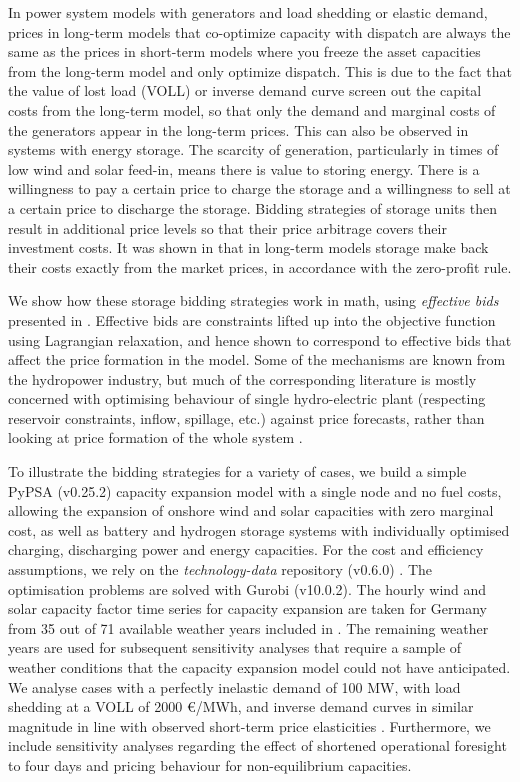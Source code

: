 \documentclass[final,3p]{elsarticle}
\begin{document}
In power system models with generators and load shedding or elastic demand,
prices in long-term models that co-optimize capacity with dispatch are always
the same as the prices in short-term models where you freeze the asset
capacities from the long-term model and only optimize dispatch. This is due to
the fact that the value of lost load (VOLL)  or inverse demand curve screen out
the capital costs from the long-term model, so that only the demand and marginal
costs of the generators appear in the long-term prices. This can also be
observed in systems with energy storage. The scarcity of generation,
particularly in times of low wind and solar feed-in, means there is value to
storing energy. There is a willingness to pay a certain price to charge the
storage and a willingness to sell at a certain price to discharge the storage.
Bidding strategies of storage units then result in additional price levels so
that their price arbitrage covers their investment costs. It was shown in
\cite{Brown2020} that in long-term models storage make back their costs exactly
from the market prices, in accordance with the zero-profit rule.

We show how these storage bidding strategies work in math, using
\textit{effective bids} presented in \cite{Brown2020}. Effective bids are
constraints lifted up into the objective function using Lagrangian relaxation,
and hence shown to correspond to effective bids that affect the price formation
in the model. Some of the mechanisms are known from the hydropower industry, but
much of the corresponding literature is mostly concerned with optimising
behaviour of single hydro-electric plant (respecting reservoir constraints,
inflow, spillage, etc.) against price forecasts, rather than looking at price
formation of the whole system
\cite{lederer1984overall,Pereira1989,Rotting1992,Fosso1999,CRAMPES2019100746}.

To illustrate the bidding strategies for a variety of cases, we build a simple
PyPSA (v0.25.2) \cite{PyPSA} capacity expansion model with a single node and no
fuel costs, allowing the expansion of onshore wind and solar capacities with
zero marginal cost, as well as battery and hydrogen storage systems with
individually optimised charging, discharging power and energy capacities. For
the cost and efficiency assumptions, we rely on the \textit{technology-data}
repository (v0.6.0) \cite{lisazeyenPyPSATechnologydata2023}. The optimisation
problems are solved with Gurobi (v10.0.2). The hourly wind and solar capacity
factor time series for capacity expansion are taken for Germany from 35 out of
71 available weather years included in \cite{rdgdr321}. The remaining weather
years are used for subsequent sensitivity analyses that require a sample of
weather conditions that the capacity expansion model could not have anticipated.
We analyse cases with a perfectly inelastic demand of 100 MW, with load shedding
at a VOLL of 2000 \euro/MWh, and inverse demand curves in similar magnitude in
line with observed short-term price elasticities \cite{hirthHowAggregate2023,RePEc:zbw:esprep:272048}.
Furthermore, we include sensitivity analyses regarding the effect of shortened
operational foresight to four days and pricing behaviour for non-equilibrium
capacities.
\end{document}
